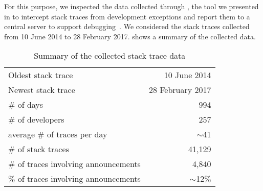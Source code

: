 For this purpose, we inspected the data collected through \sln, the tool we presented in  to intercept stack traces from development exceptions and report them to a central server to support debugging~\cite{DalS2015a}.
We considered the stack traces collected from 10 June 2014 to 28 February 2017.
 shows a summary of the collected data.

\begin{table}[ht]
\centering
\caption{Summary of the collected stack trace data}
\begin{tabular}{lr}
\hline
Oldest stack trace & 10 June 2014 \\
Newest stack trace & 28 February 2017 \\
\# of days & 994\\
\# of developers & 257\\
average \# of traces per day & $\sim$41\\
\# of stack traces & 41,129 \\
\# of traces involving announcements & 4,840 \\
\% of traces involving announcements & $\sim$12\% \\
\hline
\end{tabular}
\label{tab:stack-traces}
\end{table}



